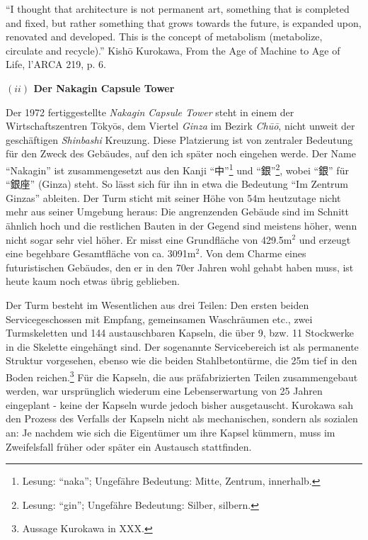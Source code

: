 \documentclass[a4paper, 12pt]{article}
\begin{document}
\begin{onehalfspace}
"`I thought that architecture is not permanent art, something that is completed and fixed, but rather something that grows towards the future, is expanded upon, renovated and developed. This is the concept of metabolism (metabolize, circulate and recycle)."'
Kishō Kurokawa, From the Age of Machine to Age of Life, l'ARCA 219, p. 6.


\vspace{5mm}
\noindent\textbf{$(ii)$ Der Nakagin Capsule Tower}

\noindent Der 1972 fertiggestellte \emph{Nakagin Capsule Tower} steht in einem der Wirtschaftszentren Tōkyōs, dem Viertel \emph{Ginza} im Bezirk \emph{Chūō}, nicht unweit der geschäftigen \emph{Shinbashi} Kreuzung. Diese Platzierung ist von zentraler Bedeutung für den Zweck des Gebäudes, auf den ich später noch eingehen werde. Der Name "`Nakagin"' ist zusammengesetzt aus den Kanji "`中"'\footnote{Lesung: "`naka"'; Ungefähre Bedeutung: Mitte, Zentrum, innerhalb.} und "`銀"'\footnote{Lesung: "`gin"'; Ungefähre Bedeutung: Silber, silbern.}, wobei "`銀"' für "`銀座"' (Ginza) steht. So lässt sich für ihn in etwa die Bedeutung "`Im Zentrum Ginzas"' ableiten. Der Turm sticht mit seiner Höhe von 54m heutzutage nicht mehr aus seiner Umgebung heraus: Die angrenzenden Gebäude sind im Schnitt ähnlich hoch und die restlichen Bauten in der Gegend sind meistens höher, wenn nicht sogar sehr viel höher. Er misst eine Grundfläche von 429.5m$^2$ und erzeugt eine begehbare Gesamtfläche von ca. 3091m$^2$. Von dem Charme eines futuristischen Gebäudes, den er in den 70er Jahren wohl gehabt haben muss, ist heute kaum noch etwas übrig geblieben. 



Der Turm besteht im Wesentlichen aus drei Teilen: Den ersten beiden Servicegeschossen mit Empfang, gemeinsamen Waschräumen etc., zwei Turmskeletten und 144 austauschbaren Kapseln, die über 9, bzw. 11 Stockwerke in die Skelette eingehängt sind. Der sogenannte Servicebereich ist als permanente Struktur vorgesehen, ebenso wie die beiden Stahlbetontürme, die 25m tief in den Boden reichen.\footnote{Aussage Kurokawa in XXX.} Für die Kapseln, die aus präfabrizierten Teilen zusammengebaut werden, war ursprünglich wiederum eine Lebenserwartung von 25 Jahren eingeplant - keine der Kapseln wurde jedoch bisher ausgetauscht. Kurokawa sah den Prozess des Verfalls der Kapseln nicht als mechanischen, sondern als sozialen an: Je nachdem wie sich die Eigentümer um ihre Kapsel kümmern, muss im Zweifelsfall früher oder später ein Austausch stattfinden. 


\end{onehalfspace}
\end{document}
